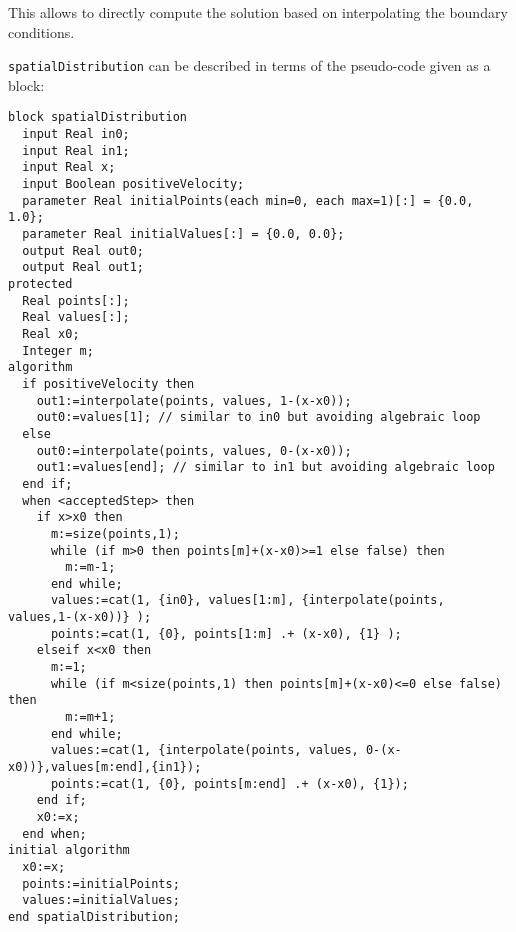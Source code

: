 This allows to directly compute the solution based on interpolating the
boundary conditions.

\lstinline!spatialDistribution! can be described in terms of the pseudo-code given as a block:
\begin{lstlisting}[language=modelica]
block spatialDistribution
  input Real in0;
  input Real in1;
  input Real x;
  input Boolean positiveVelocity;
  parameter Real initialPoints(each min=0, each max=1)[:] = {0.0, 1.0};
  parameter Real initialValues[:] = {0.0, 0.0};
  output Real out0;
  output Real out1;
protected
  Real points[:];
  Real values[:];
  Real x0;
  Integer m;
algorithm
  if positiveVelocity then
    out1:=interpolate(points, values, 1-(x-x0));
    out0:=values[1]; // similar to in0 but avoiding algebraic loop
  else
    out0:=interpolate(points, values, 0-(x-x0));
    out1:=values[end]; // similar to in1 but avoiding algebraic loop
  end if;
  when <acceptedStep> then
    if x>x0 then
      m:=size(points,1);
      while (if m>0 then points[m]+(x-x0)>=1 else false) then
        m:=m-1;
      end while;
      values:=cat(1, {in0}, values[1:m], {interpolate(points, values,1-(x-x0))} );
      points:=cat(1, {0}, points[1:m] .+ (x-x0), {1} );
    elseif x<x0 then
      m:=1;
      while (if m<size(points,1) then points[m]+(x-x0)<=0 else false) then
        m:=m+1;
      end while;
      values:=cat(1, {interpolate(points, values, 0-(x-x0))},values[m:end],{in1});
      points:=cat(1, {0}, points[m:end] .+ (x-x0), {1});
    end if;
    x0:=x;
  end when;
initial algorithm
  x0:=x;
  points:=initialPoints;
  values:=initialValues;
end spatialDistribution;
\end{lstlisting}

